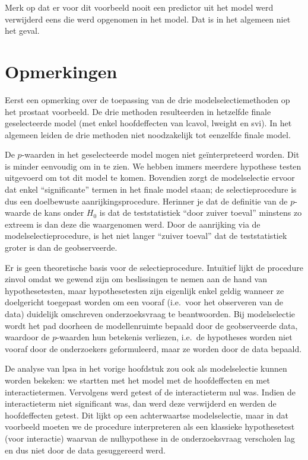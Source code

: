 \documentclass[12pt,dutch,coursenotes]{book}
\theoremstyle{definition}
\theoremstyle{definition}
\theoremstyle{definition}
\theoremstyle{remark}
\begin{document}
Merk op dat er voor dit voorbeeld nooit een predictor uit het model werd
verwijderd eens die werd opgenomen in het model. Dat is in het algemeen
niet het geval.

\section{Opmerkingen}\label{opmerkingen}

Eerst een opmerking over de toepassing van de drie modelselectiemethoden
op het prostaat voorbeeld. De drie methoden resulteerden in hetzelfde
finale geselecteerde model (met enkel hoofdeffecten van lcavol, lweight
en svi). In het algemeen leiden de drie methoden niet noodzakelijk tot
eenzelfde finale model.

De \(p\)-waarden in het geselecteerde model mogen niet geïnterpreteerd
worden. Dit is minder eenvoudig om in te zien. We hebben immers meerdere
hypothese testen uitgevoerd om tot dit model te komen. Bovendien zorgt
de modelselectie ervoor dat enkel ``significante'' termen in het finale
model staan; de selectieprocedure is dus een doelbewuste
aanrijkingsprocedure. Herinner je dat de definitie van de \(p\)-waarde
de kans onder \(H_0\) is dat de teststatistiek ``door zuiver toeval''
minstens zo extreem is dan deze die waargenomen werd. Door de aanrijking
via de modelselectieprocedure, is het niet langer ``zuiver toeval'' dat
de teststatistiek groter is dan de geobserveerde.

Er is geen theoretische basis voor de selectieprocedure. Intuïtief lijkt
de procedure zinvol omdat we gewend zijn om beslissingen te nemen aan de
hand van hypothesetesten, maar hypothesetesten zijn eigenlijk enkel
geldig wanneer ze doelgericht toegepast worden om een vooraf (i.e.~voor
het observeren van de data) duidelijk omschreven onderzoeksvraag te
beantwoorden. Bij modelselectie wordt het pad doorheen de modellenruimte
bepaald door de geobserveerde data, waardoor de \(p\)-waarden hun
betekenis verliezen, i.e.~de hypotheses worden niet vooraf door de
onderzoekers geformuleerd, maar ze worden door de data bepaald.

De analyse van lpsa in het vorige hoofdstuk zou ook als modelselectie
kunnen worden bekeken: we startten met het model met de hoofdeffecten en
met interactietermen. Vervolgens werd getest of de interactieterm nul
was. Indien de interactieterm niet significant was, dan werd deze
verwijderd en werden de hoofdeffecten getest. Dit lijkt op een
achterwaartse modelselectie, maar in dat voorbeeld moeten we de
procedure interpreteren als een klassieke hypothesetest (voor
interactie) waarvan de nulhypothese in de onderzoeksvraag verscholen lag
en dus niet door de data gesuggereerd werd.
\end{document}
